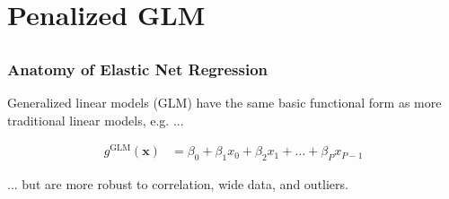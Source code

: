 \documentclass[11pt,aspectratio=169,hyperref={colorlinks}]{beamer}
\begin{document}
							
	\section{Penalized GLM}
	
		\subsection*{}


		\begin{frame}
	
		\frametitle{Anatomy of Elastic Net Regression}	
				
		Generalized linear models (GLM) have the same basic functional form as more traditional linear models, e.g. ...
				
		\begin{equation}
			\begin{aligned}\label{eq:gbm}
			g^{\text{GLM}}(\mathbf{x}) &= \beta_0 + \beta_1 x_0 + \beta_2 x_1 + \dots + \beta_P x_{P-1}
			\end{aligned}
		\end{equation}	
		
		\vspace{10pt}... but are more robust to correlation, wide data, and outliers.
		
		\end{frame}
\end{document}
